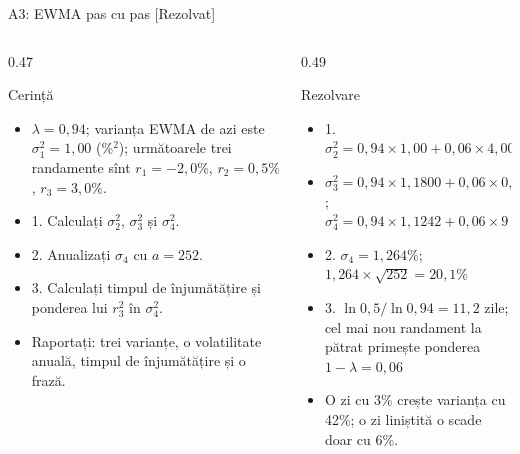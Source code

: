 \begin{frame}{A3: EWMA pas cu pas [Rezolvat]}
\itemsize{\scriptsize}
\begin{columns}[T]
\begin{column}{0.47\textwidth}
\begin{block}{Cerință}
\begin{itemize}
    \item $\lambda = 0{,}94$; varianța EWMA de azi este $\sigma_1^2 = 1{,}00$ (\%$^2$); următoarele trei randamente sînt $r_1 = -2{,}0\%$, $r_2 = 0{,}5\%$, $r_3 = 3{,}0\%$.
    \item 1. Calculați $\sigma_2^2$, $\sigma_3^2$ și $\sigma_4^2$.
    \item 2. Anualizați $\sigma_4$ cu $a = 252$.
    \item 3. Calculați timpul de înjumătățire și ponderea lui $r_3^2$ în $\sigma_4^2$.
    \item Raportați: trei varianțe, o volatilitate anuală, timpul de înjumătățire și o frază.
\end{itemize}
\end{block}
\end{column}
\begin{column}{0.49\textwidth}
\begin{exampleblock}{Rezolvare}
\begin{itemize}
    \item 1. $\sigma_2^2 = 0{,}94 \times 1{,}00 + 0{,}06 \times 4{,}00 = 1{,}1800$
    \item $\sigma_3^2 = 0{,}94 \times 1{,}1800 + 0{,}06 \times 0{,}25 = 1{,}1242$; $\sigma_4^2 = 0{,}94 \times 1{,}1242 + 0{,}06 \times 9 = 1{,}5967$
    \item 2. $\sigma_4 = 1{,}264\%$; $1{,}264 \times \sqrt{252} = 20{,}1\%$
    \item 3. $\ln 0{,}5/\ln 0{,}94 = 11{,}2$ zile; cel mai nou randament la pătrat primește ponderea $1 - \lambda = 0{,}06$
    \item O zi cu 3\% crește varianța cu 42\%; o zi liniștită o scade doar cu 6\%.
\end{itemize}
\end{exampleblock}
\end{column}
\end{columns}
\end{frame}

